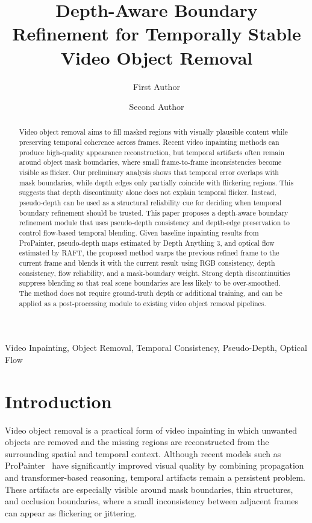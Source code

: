 \documentclass[nouppercase]{kaia}
\title{Depth-Aware Boundary Refinement for Temporally Stable Video Object Removal}
\author{First Author}{a}
\author{Second Author}{a}
\affiliation{Department of Artificial Intelligence, Institution Name, City, Republic of Korea, \{first.author, second.author\}@example.com}{a}
\begin{document}
\maketitle
\begin{abstract}
Video object removal aims to fill masked regions with visually plausible content while preserving temporal coherence across frames. Recent video inpainting methods can produce high-quality appearance reconstruction, but temporal artifacts often remain around object mask boundaries, where small frame-to-frame inconsistencies become visible as flicker. Our preliminary analysis shows that temporal error overlaps with mask boundaries, while depth edges only partially coincide with flickering regions. This suggests that depth discontinuity alone does not explain temporal flicker. Instead, pseudo-depth can be used as a structural reliability cue for deciding when temporal boundary refinement should be trusted. This paper proposes a depth-aware boundary refinement module that uses pseudo-depth consistency and depth-edge preservation to control flow-based temporal blending. Given baseline inpainting results from ProPainter, pseudo-depth maps estimated by Depth Anything 3, and optical flow estimated by RAFT, the proposed method warps the previous refined frame to the current frame and blends it with the current result using RGB consistency, depth consistency, flow reliability, and a mask-boundary weight. Strong depth discontinuities suppress blending so that real scene boundaries are less likely to be over-smoothed. The method does not require ground-truth depth or additional training, and can be applied as a post-processing module to existing video object removal pipelines.
\end{abstract}

\begin{keywords}
Video Inpainting, Object Removal, Temporal Consistency, Pseudo-Depth, Optical Flow
\end{keywords}

\section{Introduction}
Video object removal is a practical form of video inpainting in which unwanted objects are removed and the missing regions are reconstructed from the surrounding spatial and temporal context. Although recent models such as ProPainter~\cite{zhou2023propainter} have significantly improved visual quality by combining propagation and transformer-based reasoning, temporal artifacts remain a persistent problem. These artifacts are especially visible around mask boundaries, thin structures, and occlusion boundaries, where a small inconsistency between adjacent frames can appear as flickering or jittering.
\end{document}
